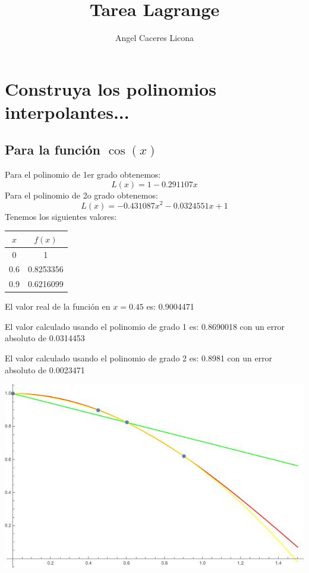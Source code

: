 \documentclass{article}
\begin{document}
\title{Tarea Lagrange}
\author{Angel Caceres Licona}

\maketitle


\section{Construya los polinomios interpolantes...}
\subsection{Para la función $\cos(x)$}
Para el polinomio de 1er grado obtenemos: 
$$L(x)=1-0.291107x$$
Para el polinomio de 2o grado obtenemos: 
$$L(x)=-0.431087 x^2-0.0324551 x+1$$
Tenemos los siguientes valores:

\begin{center}
    \begin{tabular}{||c c||} 
    \hline
    $x$ & $f(x)$ \\ [0.5ex] 
    \hline
    0 & 1  \\ 
    \hline
    0.6 & 0.8253356 \\
    \hline
    0.9 & 0.6216099 \\
    \hline
   \end{tabular}
\end{center}

El valor real de la función en $x=0.45$ es: 0.9004471

El valor calculado usando el polinomio de grado 1 es: 0.8690018 con un error absoluto de 0.0314453

El valor calculado usando el polinomio de grado 2 es: 0.8981 con un error absoluto de 0.0023471

\includegraphics[scale=0.5]{Grafica1.jpeg}
\end{document}
